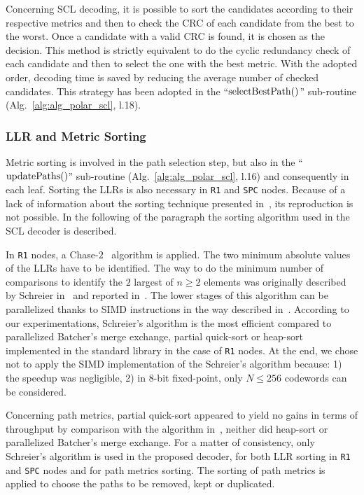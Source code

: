 Concerning SCL decoding, it is possible to sort the candidates according to
their respective metrics and then to check the CRC of each candidate from the
best to the worst. Once a candidate with a valid CRC is found, it is chosen as
the decision. This method is strictly equivalent to do the cyclic redundancy
check of each candidate and then to select the one with the best metric. With
the adopted order, decoding time is saved by reducing the average number of
checked candidates. This strategy has been adopted in the
``$\operatorname*{selectBestPath}()$'' sub-routine (Alg.~\ref{alg:alg_polar_scl}, l.18).

\subsubsection{LLR and Metric Sorting}
\label{sec:polar_sorting}

Metric sorting is involved in the path selection step, but also
in the ``$\operatorname*{updatePaths}()$'' sub-routine (Alg.~\ref{alg:alg_polar_scl}, l.16) and
consequently in each leaf. Sorting the LLRs is also necessary in \verb|R1| and
\verb|SPC| nodes. Because of a lack of information about the sorting technique
presented in~\cite{Sarkis2016}, its reproduction is not possible. In the
following of the paragraph the sorting algorithm used in the SCL decoder is
described.

In \verb|R1| nodes, a Chase-$2$~\cite{Chase1972} algorithm is applied. The two
minimum absolute values of the LLRs have to be identified. The way to do the
minimum number of comparisons to identify the $2$ largest of $n\geq2$ elements
was originally described by Schreier in~\cite{Schreier1932} and reported
in~\cite{Knuth1973}. The lower stages of this algorithm can be parallelized
thanks to SIMD instructions in the way described in~\cite{Furtak2007}. According
to our experimentations, Schreier's algorithm is the most efficient compared to
parallelized Batcher's merge exchange, partial quick-sort or heap-sort
implemented in the \Cxx standard library in the case of \verb|R1| nodes. At the
end, we chose not to apply the SIMD implementation of the Schreier's algorithm
because: 1) the speedup was negligible, 2) in 8-bit fixed-point, only
$N \leq 256$ codewords can be considered.

Concerning path metrics, partial quick-sort appeared to yield no gains in terms
of throughput by comparison with the algorithm in~\cite{Schreier1932}, neither
did heap-sort or parallelized Batcher's merge exchange. For a matter of
consistency, only Schreier's algorithm is used in the proposed decoder, for both
LLR sorting in \verb|R1| and \verb|SPC| nodes and for path metrics sorting. The
sorting of path metrics is applied to choose the paths to be removed, kept or
duplicated.

